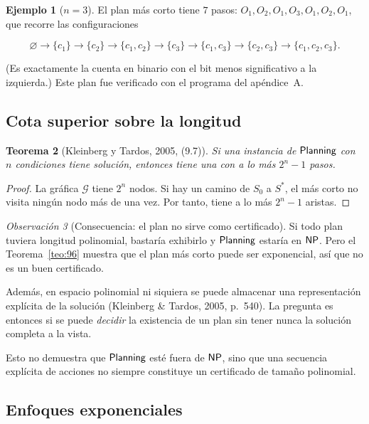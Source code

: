 \documentclass[11pt,letterpaper]{article}
\theoremstyle{plain}
\newtheorem{teorema}{Teorema}[section]
\theoremstyle{definition}
\newtheorem{ejemplo}[teorema]{Ejemplo}
\theoremstyle{remark}
\newtheorem{observacion}[teorema]{Observación}
\newcommand{\vacio}{\varnothing}
\newcommand{\nombreMat}[1]{\ensuremath{\text{\fontencoding{OT1}\fontfamily{cmss}\upshape\selectfont #1}}}
\newcommand{\NP}{\nombreMat{NP}}
\newcommand{\PLANNING}{\nombreMat{Planning}}
\begin{document}
\begin{ejemplo}[$n=3$]
El plan más corto tiene $7$ pasos:
$O_1,O_2,O_1,O_3,O_1,O_2,O_1$,
que recorre las configuraciones

\[
\vacio\to\{c_1\}\to\{c_2\}
\to\{c_1,c_2\}\to\{c_3\}
\to\{c_1,c_3\}\to\{c_2,c_3\}
\to\{c_1,c_2,c_3\}.
\]

(Es exactamente la cuenta en binario con el bit
menos significativo a la izquierda.)
Este plan fue verificado con el programa del
apéndice~A.
\end{ejemplo}

\subsection{Cota superior sobre la longitud}

\begin{teorema}[Kleinberg y Tardos, 2005, (9.7)]
\label{teo:97}
Si una instancia de \PLANNING{} con $n$ condiciones
tiene solución, entonces tiene una con a lo más
$2^{n}-1$ pasos.
\end{teorema}

\begin{proof}
La gráfica $\mathcal{G}$ tiene $2^{n}$ nodos.
Si hay un camino de $S_0$ a $S^{*}$, el más corto
no visita ningún nodo más de una vez. Por tanto,
tiene a lo más $2^{n}-1$ aristas.
\end{proof}

\begin{observacion}[Consecuencia: el plan no sirve como certificado]
Si todo plan tuviera longitud polinomial,
bastaría exhibirlo y \PLANNING{} estaría en $\NP$.
Pero el Teorema~\ref{teo:96} muestra que el plan
más corto puede ser exponencial, así que no es
un buen certificado.

Además, en espacio polinomial ni siquiera se puede
almacenar una representación explícita de la solución
(Kleinberg \& Tardos, 2005, p.~540).
La pregunta es entonces si se puede \emph{decidir}
la existencia de un plan sin tener nunca la
solución completa a la vista.


Esto no demuestra que \PLANNING{} esté fuera de
$\NP$, sino que una secuencia explícita de acciones
no siempre constituye un certificado de tamaño
polinomial.

\end{observacion}

\subsection{Enfoques exponenciales}\label{sec:enfoquesexp}
\end{document}
